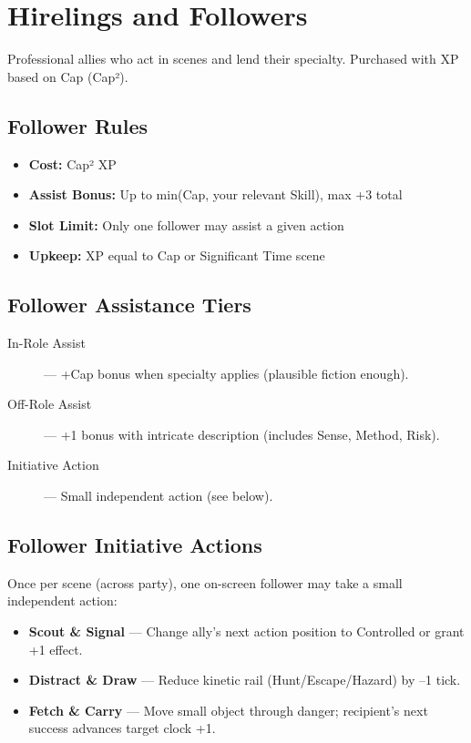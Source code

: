 \section{Hirelings and Followers}

Professional allies who act in scenes and lend their specialty. Purchased with XP based on Cap (Cap²).

\subsection*{Follower Rules}

\begin{itemize}
  \item \textbf{Cost:} Cap² XP
  \item \textbf{Assist Bonus:} Up to min(Cap, your relevant Skill), max +3 total
  \item \textbf{Slot Limit:} Only one follower may assist a given action
  \item \textbf{Upkeep:} XP equal to Cap or Significant Time scene
\end{itemize}

\subsection*{Follower Assistance Tiers}

\begin{description}
  \item[In-Role Assist] — +Cap bonus when specialty applies (plausible fiction enough).
  \item[Off-Role Assist] — +1 bonus with intricate description (includes Sense, Method, Risk).
  \item[Initiative Action] — Small independent action (see below).
\end{description}

\subsection*{Follower Initiative Actions}

Once per scene (across party), one on-screen follower may take a small independent action:

\begin{itemize}
  \item \textbf{Scout \& Signal} — Change ally's next action position to Controlled or grant +1 effect.
  \item \textbf{Distract \& Draw} — Reduce kinetic rail (Hunt/Escape/Hazard) by –1 tick.
  \item \textbf{Fetch \& Carry} — Move small object through danger; recipient's next success advances target clock +1.
\end{itemize}

